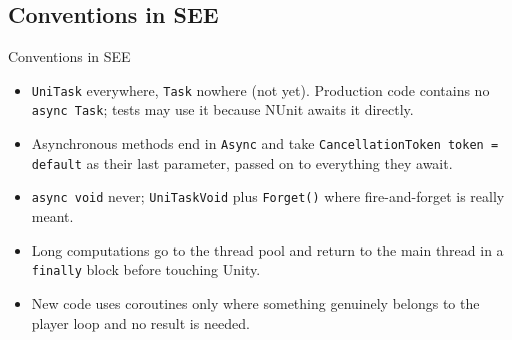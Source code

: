 \subsection{Conventions in SEE}

\begin{frame}{Conventions in SEE}
  \begin{itemize}
    \item \texttt{UniTask} everywhere, \texttt{Task} nowhere (not yet). Production code
      contains no \texttt{async Task}; tests may use it because NUnit awaits
      it directly.
    \item Asynchronous methods end in \texttt{Async} and take
      \texttt{CancellationToken token = default} as their last parameter,
      passed on to everything they await.
    \item \texttt{async void} never; \texttt{UniTaskVoid} plus
      \texttt{Forget()} where fire-and-forget is really meant.
    \item Long computations go to the thread pool and return to the main
      thread in a \texttt{finally} block before touching Unity.
    \item New code uses coroutines only where something genuinely belongs to
      the player loop and no result is needed.
  \end{itemize}
  \vspace{2ex}

\end{frame}

\endinput

